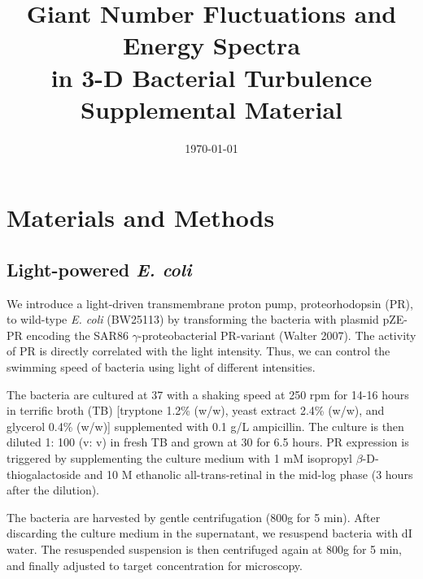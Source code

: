 \documentclass[preprint,aps,prl,amsmath,amssymb,longbibliography]{revtex4-2}
\date{\today}
\begin{document}
\title{Giant Number Fluctuations and Energy Spectra\\
        in 3-D Bacterial Turbulence\\
        Supplemental Material}
\maketitle



\section{Materials and Methods}
\label{sec:method}
\subsection{Light-powered \textit{E. coli}}
We introduce a light-driven transmembrane proton pump, proteorhodopsin (PR), to wild-type \textit{E. coli} (BW25113) by transforming the bacteria with plasmid pZE-PR encoding the SAR86 $\gamma$-proteobacterial PR-variant (Walter 2007). The activity of PR is directly correlated with the light intensity. Thus, we can control the swimming speed of bacteria using light of different intensities.

The bacteria are cultured at 37 \textcelsius{} with a shaking speed at 250 rpm for 14-16 hours in terrific broth (TB) [tryptone 1.2\% (w/w), yeast extract 2.4\% (w/w), and glycerol 0.4\% (w/w)] supplemented with 0.1 g/L ampicillin. The culture is then diluted 1: 100 (v: v) in fresh TB and grown at 30 \textcelsius{} for 6.5 hours. PR expression is triggered by supplementing the culture medium with 1 mM isopropyl $\beta$-D-thiogalactoside and 10 \textmu M ethanolic all-trans-retinal in the mid-log phase (3 hours after the dilution).

The bacteria are harvested by gentle centrifugation (800g for 5 min). After discarding the culture medium in the supernatant, we resuspend bacteria with dI water. The resuspended suspension is then centrifuged again at 800g for 5 min, and finally adjusted to target concentration for microscopy.
\end{document}
